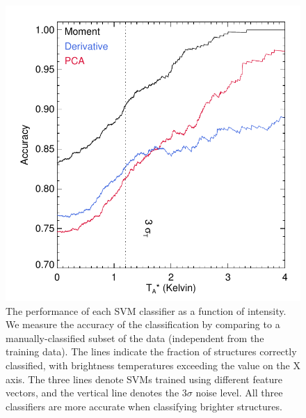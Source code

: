  \begin{figure}
 \includegraphics{optimize}
 \caption{The performance of each SVM classifier as a function of intensity. We measure the accuracy of the classification by comparing to a manually-classified subset of the data (independent from the training data). The lines indicate the fraction of structures correctly classified, with brightness temperatures exceeding the value on the X axis. The three lines denote SVMs trained using different feature vectors, and the vertical line denotes the 3$\sigma$ noise level. All three classifiers are more accurate when classifying brighter structures.}
 \label{fig:optimize}
\end{figure}

